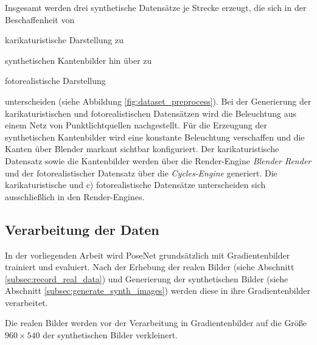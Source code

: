 Insgesamt werden drei synthetische Datensätze je Strecke erzeugt, die sich in der Beschaffenheit von \begin{enumerate*}[label=\alph*)]
	\item karikaturistische Darstellung zu
	\item synthetischen Kantenbilder hin über zu
	\item fotorealistische Darstellung
\end{enumerate*} unterscheiden (siehe Abbildung \ref{fig:dataset_preprocess}). Bei der Generierung der karikaturistischen und fotorealistischen Datensätzen wird die Beleuchtung aus einem Netz von Punktlichtquellen nachgestellt.
Für die Erzeugung der synthetischen Kantenbilder wird eine konstante Beleuchtung verschaffen und die Kanten über Blender markant sichtbar konfiguriert. Der karikaturistische Datensatz sowie die Kantenbilder werden über die Render-Engine \textit{Blender Render} und der fotorealistischer Datensatz über die \textit{Cycles-Engine} generiert. Die karikaturistische und c) fotorealistische Datensätze unterscheiden sich ausschließlich in den Render-Engines.

\subsection{Verarbeitung der Daten}
In der vorliegenden Arbeit wird PoseNet grundsätzlich mit Gradientenbilder trainiert und evaluiert. Nach der Erhebung der realen Bilder (siehe Abschnitt \ref{subsec:record_real_data}) und Generierung der synthetischen Bilder (siehe Abschnitt \ref{subsec:generate_synth_images}) werden diese in ihre Gradientenbilder verarbeitet. 


Die realen Bilder werden vor der Verarbeitung in Gradientenbilder auf die Größe $960 \times 540$ der synthetischen Bilder verkleinert.


